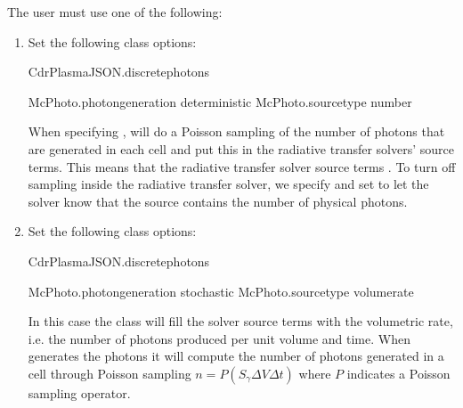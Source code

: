 \documentclass[letterpaper,10pt,english]{sphinxmanual}
\begin{document}
\sphinxAtStartPar
The user must use one of the following:
\begin{enumerate}
%
\item {} 
\sphinxAtStartPar
Set the following class options:

\begin{sphinxVerbatim}[commandchars=\\\{\},formatcom=\scriptsize]
CdrPlasmaJSON.discrete\PYGZus{}photons  

McPhoto.photon\PYGZus{}generation  deterministic
McPhoto.source\PYGZus{}type        number
\end{sphinxVerbatim}

\sphinxAtStartPar
When specifying ,  will do a Poisson sampling of the number of photons that are generated in each cell and put this in the radiative transfer solvers’ source terms.
This means that the radiative transfer solver source terms .
To turn off sampling inside the radiative transfer solver, we specify  and set  to let the solver know that the source contains the number of physical photons.

\item {} 
\sphinxAtStartPar
Set the following class options:

\begin{sphinxVerbatim}[commandchars=\\\{\},formatcom=\scriptsize]
CdrPlasmaJSON.discrete\PYGZus{}photons  

McPhoto.photon\PYGZus{}generation  stochastic
McPhoto.source\PYGZus{}type        volume\PYGZus{}rate
\end{sphinxVerbatim}

\sphinxAtStartPar
In this case the  class will fill the solver source terms with the volumetric rate, i.e. the number of photons produced per unit volume and time.
When  generates the photons it will compute the number of photons generated in a cell through Poisson sampling \(n = P\left(S_\gamma\Delta V\Delta t\right)\) where \(P\) indicates a Poisson sampling operator.

\end{enumerate}
\end{document}
